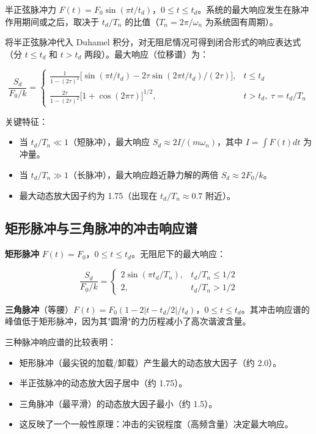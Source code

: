 半正弦脉冲力 $F(t) = F_0\sin(\pi t/t_d)$，$0 \leq t \leq t_d$。系统的最大响应发生在脉冲作用期间或之后，取决于 $t_d/T_n$ 的比值（$T_n = 2\pi/\omega_n$ 为系统固有周期）。

将半正弦脉冲代入 Duhamel 积分，对无阻尼情况可得到闭合形式的响应表达式（分 $t \leq t_d$ 和 $t > t_d$ 两段）。最大响应（位移谱）为：

\begin{myformula}
\[
\frac{S_d}{F_0/k} = 
\begin{cases}
\frac{1}{1 - (2\tau)^2}\bigl[ \sin(\pi t/t_d) - 2\tau\sin(2\pi t/t_d)/(2\tau) \bigr], & t \leq t_d \\[6pt]
\frac{2\tau}{1 - (2\tau)^2} \bigl[ 1 + \cos(2\pi\tau) \bigr]^{1/2}, & t > t_d,\; \tau = t_d/T_n
\end{cases}
\]
\end{myformula}

关键特征：
\begin{itemize}
\item 当 $t_d/T_n \ll 1$（短脉冲），最大响应 $S_d \approx 2I/(m\omega_n)$，其中 $I = \int F(t)dt$ 为冲量。
\item 当 $t_d/T_n \gg 1$（长脉冲），最大响应趋近静力解的两倍 $S_d \approx 2F_0/k$。
\item 最大动态放大因子约为 1.75（出现在 $t_d/T_n \approx 0.7$ 附近）。
\end{itemize}

\subsection{矩形脉冲与三角脉冲的冲击响应谱}

\textbf{矩形脉冲} $F(t) = F_0$，$0 \leq t \leq t_d$。无阻尼下的最大响应：

\[
\frac{S_d}{F_0/k} = 
\begin{cases}
2\sin(\pi t_d/T_n), & t_d/T_n \leq 1/2 \\
2, & t_d/T_n > 1/2
\end{cases}
\]

\textbf{三角脉冲}（等腰）$F(t) = F_0(1 - 2|t - t_d/2|/t_d)$，$0 \leq t \leq t_d$。其冲击响应谱的峰值低于矩形脉冲，因为其"圆滑"的力历程减小了高次谐波含量。

三种脉冲响应谱的比较表明：
\begin{itemize}
\item 矩形脉冲（最尖锐的加载/卸载）产生最大的动态放大因子（约 2.0）。
\item 半正弦脉冲的动态放大因子居中（约 1.75）。
\item 三角脉冲（最平滑）的动态放大因子最小（约 1.5）。
\item 这反映了一个一般性原理：冲击的尖锐程度（高频含量）决定最大响应。
\end{itemize}

